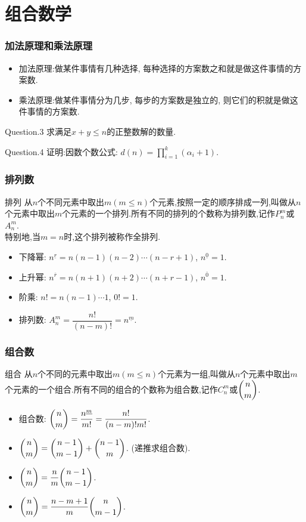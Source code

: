 \documentclass{beamer}
\newcommand{\pau}{}
\begin{document}
\section{组合数学}
\begin{frame}[fragile]
    \frametitle{加法原理和乘法原理}
    \begin{itemize}
        \item 加法原理:做某件事情有几种选择, 每种选择的方案数之和就是做这件事情的方案数. \pau
        \item 乘法原理:做某件事情分为几步, 每步的方案数是独立的, 则它们的积就是做这件事情的方案数.
    \end{itemize}\pau
    \begin{exampleblock}{Question.3}
        求满足$x+y\leqslant n$的正整数解的数量.
    \end{exampleblock}\pau
    \begin{exampleblock}{Question.4}
        证明:因数个数公式: $d(n)=\prod\limits_{i=1}^k(\alpha_i+1)$.
    \end{exampleblock}
\end{frame}

\begin{frame}[fragile]
    \frametitle{排列数}
    \begin{block}{排列}
        从$n$个不同元素中取出$m(m\leqslant n)$个元素,按照一定的顺序排成一列,叫做从$n$个元素中取出$m$个元素的一个排列.所有不同的排列的个数称为排列数,记作$P_n^m$或$A_n^m$.\\
        特别地,当$m=n$时,这个排列被称作全排列.
    \end{block}\pau
    \begin{itemize}
        \item 下降幂: $n^{\underline{r}}=n(n-1)(n-2)\cdots(n-r+1)$, $n^{\underline{0}}=1$.\pau
        \item 上升幂: $n^{\overline{r}}=n(n+1)(n+2)\cdots(n+r-1)$, $n^{\overline{0}}=1$. \pau
        \item 阶乘: $n!=n(n-1)\cdots1$, $0!=1$. \pau
        \item 排列数: $A_n^m=\dfrac{n!}{(n-m)!}=n^{\underline{m}}$.
    \end{itemize}
\end{frame}

\begin{frame}[fragile]
    \frametitle{组合数}
    \begin{block}{组合}
        从$n$个不同的元素中取出$m(m\leqslant n)$个元素为一组,叫做从$n$个元素中取出$m$个元素的一个组合.所有不同的组合的个数称为组合数,记作$C_n^m$或$\dbinom{n}{m}$.
    \end{block}\pau
    \begin{itemize}
        \item 组合数: $\dbinom{n}{m}=\dfrac{n^{\underline{m}}}{m!}=\dfrac{n!}{\left(n-m\right)!m!}$. \pau
        \item $\dbinom{n}{m}=\dbinom{n-1}{m-1}+\dbinom{n-1}{m}$. (递推求组合数). \pau
	\item $\dbinom{n}{m}=\dfrac{n}{m}\dbinom{n-1}{m-1}$. \pau
	\item $\dbinom{n}{m}=\dfrac{n-m+1}{m}\dbinom{n}{m-1}$.
    \end{itemize}
\end{frame}
\end{document}
